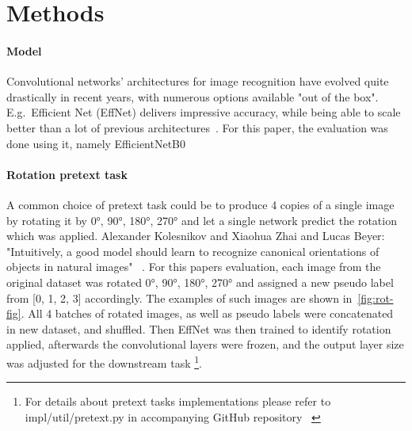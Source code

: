 \section{Methods}

\paragraph{Model}
Convolutional networks' architectures for image recognition have evolved quite drastically in recent years,
with numerous options available "out of the box".
E.g.\ Efficient Net (EffNet) delivers impressive accuracy, while being able to scale better than a lot of
previous architectures~\cite{DBLP:journals/corr/abs-1905-11946}.
For this paper, the evaluation was done using it, namely EfficientNetB0~\cite{KerasEffNet}

\paragraph{Rotation pretext task}
A common choice of pretext task could be to produce 4 copies of
a single image by rotating it by {0°, 90°, 180°, 270°} and let a single network predict the rotation which was applied.
Alexander Kolesnikov and Xiaohua Zhai and Lucas Beyer: "Intuitively, a good model should learn to
recognize canonical orientations of objects in natural images" ~\cite{kolesnikov2019revisiting}.
For this papers evaluation, each image from the original dataset was rotated 0°, 90°, 180°,
270° and assigned a new pseudo label from [0, 1, 2, 3] accordingly.
The examples of such images are shown in~\ref{fig:rot-fig}.
All 4 batches of rotated images, as well as pseudo labels were concatenated in new dataset, and shuffled.
Then EffNet was then trained to identify rotation applied, afterwards the convolutional layers were frozen,
and the output layer size was adjusted for the downstream task \footnote{For details about pretext tasks implementations please refer to
impl/util/pretext.py in accompanying GitHub repository~\cite{github} \label{fn-pre}}.

